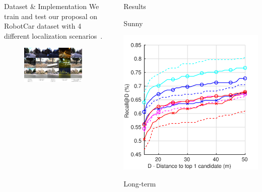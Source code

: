 \documentclass[final]{beamer}
\newlength{\sepwidth}
\newlength{\colwidth}
\newcommand{\separatorcolumn}{\begin{column}{\sepwidth}\end{column}}
\begin{document}
\begin{frame}[t]
\begin{columns}[t]
\begin{column}{\colwidth}
\begin{block}{Dataset \& Implementation}
	We train and test our proposal on RobotCar dataset with 4 different localization scenarios~\cite{Maddern2016}.
	\begin{figure}
		\includegraphics[width=\linewidth]{vect/res/dataset}
	\end{figure}
  \end{block}
\end{column}

\separatorcolumn

\begin{column}{\colwidth}
  \begin{block}{Results}
  		\begin{minipage}{0.49\linewidth}
	  		\centering
	  		Sunny
	  		
			\includegraphics[width=\linewidth]{vect/res/sunny}
		\end{minipage}\hfill
		\begin{minipage}{0.49\linewidth}
	  		\centering
			Long-term
			

\end{minipage}
\end{block}
\end{column}
\end{columns}
\end{frame}
\end{document}

